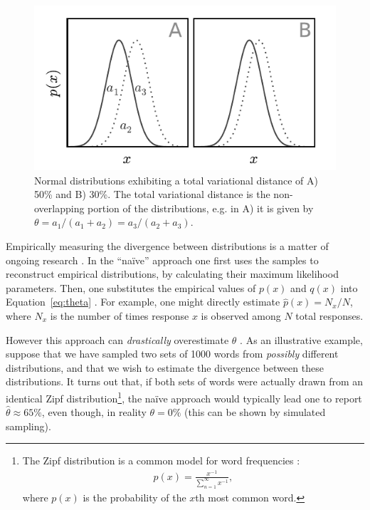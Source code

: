 \documentclass{sigchi}
\begin{document}
\begin{figure}
	\centering
	\includegraphics[scale=1.0]{figs/normal_example.pdf}
	\caption{
	  	Normal distributions exhibiting a total variational distance
		of A) 50\% and B) 30\%.  The total variational distance is 
		the non-overlapping portion of the distributions, e.g. in
		A) it is given by 
		$\theta = a_1 / (a_1 + a_2) = a_3 / (a_2 + a_3)$.
	}
	\label{fig:l1_example}
\end{figure}

Empirically measuring the divergence between distributions
is a matter of ongoing
research \cite{val-thesis,batu2013testing,chan2014optimal}.
In the ``na\"ive'' approach one first uses the samples to reconstruct 
empirical
distributions, by calculating their maximum likelihood parameters.
Then, one substitutes the empirical values of $p(x)$ and $q(x)$ into 
Equation~\ref{eq:theta} \cite{batu2013testing}.  
For example, one might directly estimate $\hat{p}(x) = N_x/N$, 
where $N_x$ is the number of times response $x$ is observed among $N$ 
total responses.

However this approach can \textit{drastically} overestimate $\theta$
\cite{val-thesis}.  As an illustrative example,
suppose that we have sampled two sets of 1000 words from \textit{possibly} 
different distributions, and that we wish to estimate the divergence 
between these distributions.  
It turns out that, if both sets of words were actually drawn from 
an identical Zipf distribution\footnote{The 
  Zipf distribution is a common model for word frequencies 
  \cite{powers1998applications,zipf1949human}:
  \begin{align}
	p(x) = \frac{x^{-1}}{\sum_{n=1}^{\infty}x^{-1}},
	\label{eq:zipf}
  \end{align}
  where $p(x)$ is the probability of the $x$th most common word.
}, the na\"ive approach would typically lead one to report 
$\hat{\theta} \approx 65\%$, even though, in reality $\theta = 0\%$
(this can be shown by simulated sampling).
\end{document}
